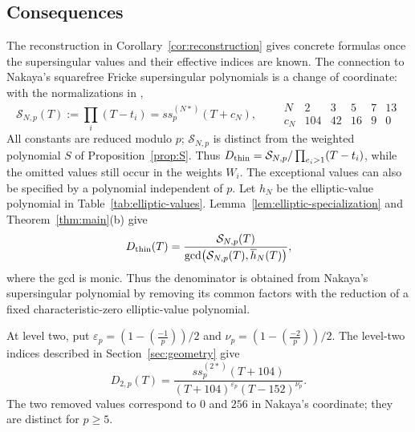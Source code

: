 \documentclass[11pt,a4paper]{article}
\numberwithin{equation}{section}
\theoremstyle{definition}
\theoremstyle{remark}
\begin{document}
\subsection{Consequences}\label{subsec:consequences}
The reconstruction in Corollary~\ref{cor:reconstruction} gives concrete formulas
once the supersingular values and their effective indices are known.
The connection to Nakaya's squarefree Fricke supersingular polynomials is a
change of coordinate: with the normalizations in \citet[\S4]{Nakaya19},
\begin{equation}\label{eq:nakaya-coordinate}
\mathcal S_{N,p}(T):=\prod_i(T-t_i)=ss_p^{(N*)}(T+c_N),\qquad
\begin{array}{c|rrrrr}
N&2&3&5&7&13\\\hline
c_N&104&42&16&9&0
\end{array}
\end{equation}
All constants are reduced modulo $p$; $\mathcal S_{N,p}$ is distinct from the
weighted polynomial $S$ of Proposition~\ref{prop:S}. Thus
$D_{\rm thin}=\mathcal S_{N,p}/\prod_{e_i>1}(T-t_i)$, while the omitted
values still occur in the weights $W_i$.
The exceptional values can also be specified by a polynomial independent of $p$.
Let $h_N$ be the elliptic-value polynomial in Table~\ref{tab:elliptic-values}.
Lemma~\ref{lem:elliptic-specialization} and Theorem~\ref{thm:main}(b) give
\begin{equation}\label{eq:elliptic-gcd}
D_{\rm thin}(T)=\frac{\mathcal S_{N,p}(T)}
{\gcd\bigl(\mathcal S_{N,p}(T),\overline h_N(T)\bigr)},
\end{equation}
where the gcd is monic. Thus the denominator is obtained from Nakaya's
supersingular polynomial by removing its common factors with the reduction
of a fixed characteristic-zero elliptic-value polynomial.

At level two, put
$\varepsilon_p=(1-\left(\frac{-1}{p}\right))/2$ and
$\nu_p=(1-\left(\frac{-2}{p}\right))/2$.
The level-two indices described in Section~\ref{sec:geometry} give
\begin{equation}\label{eq:leveltwo-denominator}
D_{2,p}(T)=\frac{ss_p^{(2*)}(T+104)}
{(T+104)^{\varepsilon_p}(T-152)^{\nu_p}}.
\end{equation}
The two removed values correspond to $0$ and $256$ in Nakaya's coordinate;
they are distinct for $p\ge5$.
\end{document}
